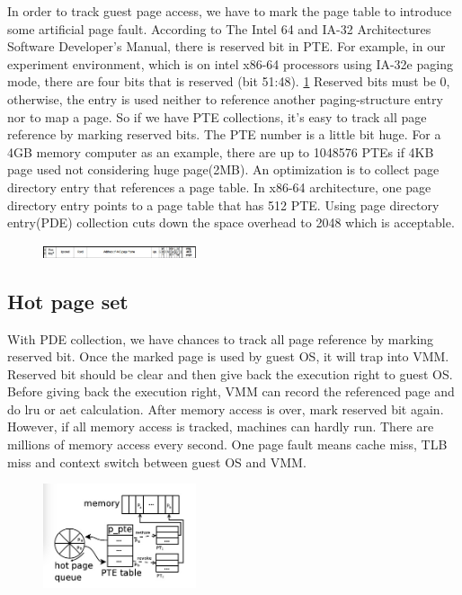 \documentclass[10pt,twocolumn]{article}
\begin{document}
In order to track guest page access, we have to mark the page table to introduce some 
artificial page fault. According to The Intel 64 and IA-32 Architectures Software Developer's Manual\cite{Intel}, there is reserved bit in PTE. For example, in our experiment environment, which is on intel x86-64 processors using IA-32e paging mode, there are four bits that is reserved (bit 51:48). \ref{fig2} Reserved bits must be 0, otherwise, the entry is used neither to reference another paging-structure entry nor to map a page. So if we have PTE collections, it's easy to track all page reference by marking reserved bits. The PTE number is a little bit huge. For a 4GB memory computer as an example, there are up to 1048576 PTEs if 4KB page used not considering huge page(2MB). An optimization is to collect page directory entry that references a page table. In x86-64 architecture, one page directory entry points to a page table that has 512 PTE. Using page directory entry(PDE) collection cuts down the space overhead to 2048 which is acceptable.
\begin{figure}\label{fig2}
	\centering
	\includegraphics[width=0.4\textwidth]{pte.jpeg}
\end{figure}

\subsection{Hot page set}
With PDE collection, we have chances to track all page reference by marking reserved bit. Once the marked page is used by guest OS, it will trap into VMM. Reserved bit should be clear and then give back the execution right to guest OS. Before giving back the execution right, VMM can record the referenced page and do lru or aet calculation. After memory access is over, mark reserved bit again. However, if all memory access is tracked, machines can hardly run. There are millions of memory access every second. One page fault means cache miss, TLB miss and context switch between guest OS and VMM.

\begin{figure}\label{fig3}
	\centering
	\includegraphics[width=0.4\textwidth]{hss.jpeg}
\end{figure}
\end{document}
